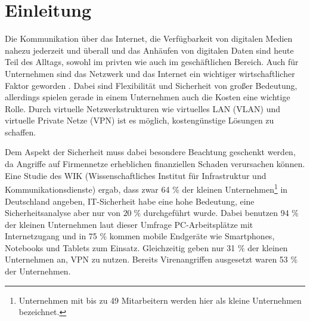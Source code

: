 \chapter{Einleitung}



Die Kommunikation über das Internet, die Verfügbarkeit von digitalen Medien nahezu jederzeit und überall und das Anhäufen von digitalen Daten  sind  heute Teil des Alltags, sowohl im privten wie auch im geschäftlichen Bereich. Auch für Unternehmen  sind das Netzwerk und das Internet ein wichtiger wirtschaftlicher Faktor geworden \cite{lipp2007vpn}. Dabei sind  Flexibilität und Sicherheit von großer Bedeutung, allerdings spielen gerade in einem Unternehmen auch die Kosten eine wichtige Rolle. Durch virtuelle Netzwerkstrukturen wie virtuelles LAN (VLAN) und virtuelle Private Netze (VPN) ist es möglich, kostengünstige Lösungen zu schaffen. 

Dem Aspekt der Sicherheit muss dabei besondere Beachtung geschenkt werden, da Angriffe auf Firmennetze erheblichen finanziellen Schaden verursachen können.\\  

Eine Studie des WIK (Wissenschaftliches Institut für Infrastruktur und Kommunikationsdienste) \cite{wik2017KMU} ergab, dass zwar 64 \% der kleinen Unternehmen\footnote{Unternehmen mit bis zu 49 Mitarbeitern werden hier als kleine Unternehmen bezeichnet.} in Deutschland angeben, IT-Sicherheit habe eine hohe Bedeutung, eine Sicherheitsanalyse aber nur von $20\; \%$ durchgeführt wurde.
Dabei benutzen 94 \% der kleinen Unternehmen laut dieser Umfrage PC-Arbeitsplätze mit Internetzugang und in  75 \%  kommen mobile Endgeräte wie Smartphones, Notebooks und Tablets zum Einsatz. Gleichzeitig geben nur 31 \% der kleinen Unternehmen an, VPN zu nutzen. Bereits Virenangriffen ausgesetzt waren 53 \% der Unternehmen. 









